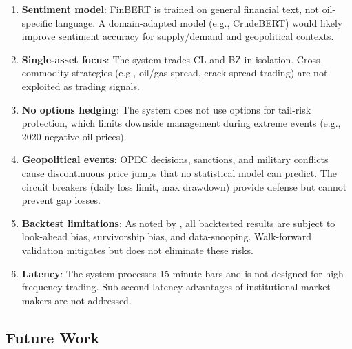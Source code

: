 \documentclass[12pt,a4paper]{article}
\begin{document}
\begin{enumerate}[leftmargin=*]
    \item \textbf{Sentiment model}: FinBERT is trained on general financial text, not oil-specific language. A domain-adapted model (e.g., CrudeBERT) would likely improve sentiment accuracy for supply/demand and geopolitical contexts.

    \item \textbf{Single-asset focus}: The system trades CL and BZ in isolation. Cross-commodity strategies (e.g., oil/gas spread, crack spread trading) are not exploited as trading signals.

    \item \textbf{No options hedging}: The system does not use options for tail-risk protection, which limits downside management during extreme events (e.g., 2020 negative oil prices).

    \item \textbf{Geopolitical events}: OPEC decisions, sanctions, and military conflicts cause discontinuous price jumps that no statistical model can predict. The circuit breakers (daily loss limit, max drawdown) provide defense but cannot prevent gap losses.

    \item \textbf{Backtest limitations}: As noted by \citet{harvey2015backtesting}, all backtested results are subject to look-ahead bias, survivorship bias, and data-snooping. Walk-forward validation mitigates but does not eliminate these risks.

    \item \textbf{Latency}: The system processes 15-minute bars and is not designed for high-frequency trading. Sub-second latency advantages of institutional market-makers are not addressed.
\end{enumerate}

\subsection{Future Work}
\end{document}

